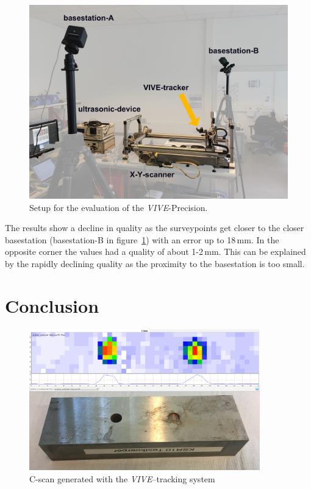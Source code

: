 \documentclass{VRARWorkshop}
\begin{document}
\begin{figure}[h!]
    \begin{center}
        \includegraphics[width=120mm]{images/PrecisionMeasurement}
        \caption{\label{fig:precisionMeasurementSetup} Setup for the evaluation of the \textit{VIVE}-Precision.}
    \end{center}
\end{figure}

The results show a decline in quality as the surveypoints get closer to the closer basestation (basestation-B in figure~\ref{fig:precisionMeasurementSetup}) with an error up to 18\,mm.
In the opposite corner the values had a quality of about 1-2\,mm.
This can be explained by the rapidly declining quality as the proximity to the basestation is too small.

\section{Conclusion}

\begin{figure}[h!]
    \begin{center}
        \includegraphics[width=100mm]{images/CScanARUS}
        \caption{\label{fig:resultCScan} C-scan generated with the \textit{VIVE}--tracking system}
    \end{center}
\end{figure}
\end{document}
